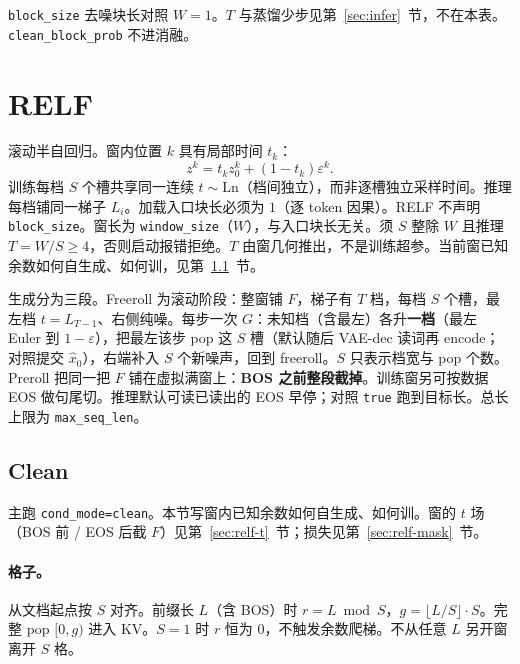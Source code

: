\documentclass[UTF8,a4paper,11pt]{ctexart}
\begin{document}
\texttt{block\_size} 去噪块长对照 \(W=1\)。\(T\) 与蒸馏少步见第~\ref{sec:infer}~节，不在本表。\texttt{clean\_block\_prob} 不进消融。

\section{RELF}
\label{sec:relf}

滚动半自回归。窗内位置 \(k\) 具有局部时间 \(t_k\)：
\[
z^k=t_k z_0^k+(1-t_k)\varepsilon^k.
\]
训练每档 \(S\) 个槽共享同一连续 \(t\sim\mathrm{Ln}\)（档间独立），而非逐槽独立采样时间。推理每档铺同一梯子 \(L_i\)。加载入口块长必须为 \(1\)（逐 token 因果）。RELF 不声明 \texttt{block\_size}。窗长为 \texttt{window\_size}（\(W\)），与入口块长无关。须 \(S\) 整除 \(W\) 且推理 \(T=W/S\ge 4\)，否则启动报错拒绝。\(T\) 由窗几何推出，不是训练超参。当前窗已知余数如何自生成、如何训，见第~\ref{sec:relf-clean}~节。

生成分为三段。Freeroll 为滚动阶段：整窗铺 \(F\)，梯子有 \(T\) 档，每档 \(S\) 个槽，最左档 \(t=L_{T-1}\)、右侧纯噪。每步一次 \(G\)：未知档（含最左）各升\textbf{一档}（最左 Euler 到 \(1-\varepsilon\)），把最左该步 pop 这 \(S\) 槽（默认随后 VAE-dec 读词再 encode；对照提交 \(\hat x_0\)），右端补入 \(S\) 个新噪声，回到 freeroll。\(S\) 只表示档宽与 pop 个数。Preroll 把同一把 \(F\) 铺在虚拟满窗上：\textbf{BOS 之前整段截掉}。训练窗另可按数据 EOS 做句尾切。推理默认可读已读出的 EOS 早停；对照 \texttt{true} 跑到目标长。总长上限为 \texttt{max\_seq\_len}。

\subsection{Clean}
\label{sec:relf-clean}

主跑 \texttt{cond\_mode=clean}。本节写窗内已知余数如何自生成、如何训。窗的 \(t\) 场（BOS 前 / EOS 后截 \(F\)）见第~\ref{sec:relf-t}~节；损失见第~\ref{sec:relf-mask}~节。

\paragraph{格子。}
从文档起点按 \(S\) 对齐。前缀长 \(L\)（含 BOS）时 \(r=L\bmod S\)，\(g=\lfloor L/S\rfloor\cdot S\)。完整 pop \([0,g)\) 进入 KV。\(S=1\) 时 \(r\) 恒为 0，不触发余数爬梯。不从任意 \(L\) 另开窗离开 \(S\) 格。
\end{document}

